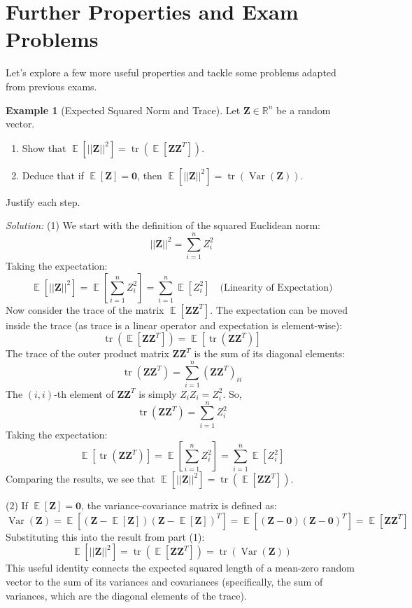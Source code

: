 \documentclass[11pt]{article}
\theoremstyle{definition}
\newtheorem{example}[theorem]{Example}
\theoremstyle{remark}
\DeclareMathOperator{\E}{\mathbb{E}}
\DeclareMathOperator{\Var}{\operatorname{Var}}
\DeclareMathOperator{\tr}{\operatorname{tr}}
\begin{document}
\section{Further Properties and Exam Problems}

Let's explore a few more useful properties and tackle some problems adapted from previous exams.

\begin{example}[Expected Squared Norm and Trace] \label{ex:trace_norm}
    Let $\bm{Z} \in \mathbb{R}^n$ be a random vector.
    \begin{enumerate}
        \item Show that $\E[||\bm{Z}||^2] = \tr(\E[\bm{Z}\bm{Z}^T])$.
        \item Deduce that if $\E[\bm{Z}] = \mathbf{0}$, then $\E[||\bm{Z}||^2] = \tr(\Var(\bm{Z}))$.
    \end{enumerate}
    Justify each step.

    \emph{Solution:}
    (1) We start with the definition of the squared Euclidean norm:
    \[ ||\bm{Z}||^2 = \sum_{i=1}^n Z_i^2 \]
    Taking the expectation:
    \[ \E[||\bm{Z}||^2] = \E\left[ \sum_{i=1}^n Z_i^2 \right] = \sum_{i=1}^n \E[Z_i^2] \quad \text{(Linearity of Expectation)} \]
    Now consider the trace of the matrix $\E[\bm{Z}\bm{Z}^T]$. The expectation can be moved inside the trace (as trace is a linear operator and expectation is element-wise):
    \[ \tr(\E[\bm{Z}\bm{Z}^T]) = \E[\tr(\bm{Z}\bm{Z}^T)] \]
    The trace of the outer product matrix $\bm{Z}\bm{Z}^T$ is the sum of its diagonal elements:
    \[ \tr(\bm{Z}\bm{Z}^T) = \sum_{i=1}^n (\bm{Z}\bm{Z}^T)_{ii} \]
    The $(i, i)$-th element of $\bm{Z}\bm{Z}^T$ is simply $Z_i Z_i = Z_i^2$. So,
    \[ \tr(\bm{Z}\bm{Z}^T) = \sum_{i=1}^n Z_i^2 \]
    Taking the expectation:
    \[ \E[\tr(\bm{Z}\bm{Z}^T)] = \E\left[ \sum_{i=1}^n Z_i^2 \right] = \sum_{i=1}^n \E[Z_i^2] \]
    Comparing the results, we see that $\E[||\bm{Z}||^2] = \tr(\E[\bm{Z}\bm{Z}^T])$.

    (2) If $\E[\bm{Z}] = \mathbf{0}$, the variance-covariance matrix is defined as:
    \[ \Var(\bm{Z}) = \E[(\bm{Z} - \E[\bm{Z}])(\bm{Z} - \E[\bm{Z}])^T] = \E[(\bm{Z} - \mathbf{0})(\bm{Z} - \mathbf{0})^T] = \E[\bm{Z}\bm{Z}^T] \]
    Substituting this into the result from part (1):
    \[ \E[||\bm{Z}||^2] = \tr(\E[\bm{Z}\bm{Z}^T]) = \tr(\Var(\bm{Z})) \]
    This useful identity connects the expected squared length of a mean-zero random vector to the sum of its variances and covariances (specifically, the sum of variances, which are the diagonal elements of the trace).
\end{example}
\end{document}
